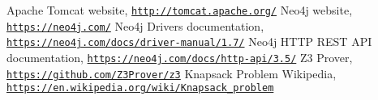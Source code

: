 \begin{thebibliography}{1}
  Apache Tomcat website, \texttt{\url{http://tomcat.apache.org/}}
  Neo4j website, \texttt{\url{https://neo4j.com/}}
  Neo4j Drivers documentation, \texttt{\url{https://neo4j.com/docs/driver-manual/1.7/}}
  Neo4j HTTP REST API documentation, \texttt{\url{https://neo4j.com/docs/http-api/3.5/}}
  Z3 Prover, \texttt{\url{https://github.com/Z3Prover/z3}}
  Knapsack Problem Wikipedia, \texttt{\url{https://en.wikipedia.org/wiki/Knapsack_problem}}
\end{thebibliography}
